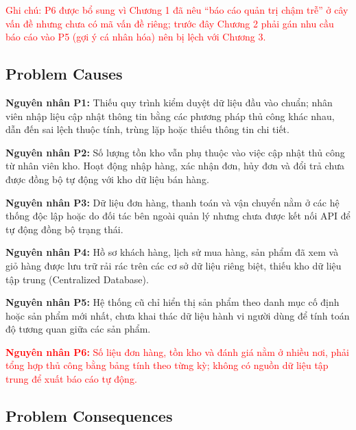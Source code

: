 \documentclass[12pt,a4paper,oneside]{report}
\newif\ifmark \marktrue
\newcommand{\chg}[1]{\ifmark\textcolor{red}{#1}\else #1\fi}
\begin{document}
\chg{Ghi chú: P6 được bổ sung vì Chương 1 đã nêu ``báo cáo quản trị chậm trễ'' ở cây vấn đề nhưng chưa có mã vấn đề riêng; trước đây Chương 2 phải gán nhu cầu báo cáo vào P5 (gợi ý cá nhân hóa) nên bị lệch với Chương 3.}

\subsection{Problem Causes}

\begin{itemize}
  \item \textbf{Nguyên nhân P1:} Thiếu quy trình kiểm duyệt dữ liệu đầu vào chuẩn; nhân viên nhập liệu cập nhật thông tin bằng các phương pháp thủ công khác nhau, dẫn đến sai lệch thuộc tính, trùng lặp hoặc thiếu thông tin chi tiết.
  \item \textbf{Nguyên nhân P2:} Số lượng tồn kho vẫn phụ thuộc vào việc cập nhật thủ công từ nhân viên kho. Hoạt động nhập hàng, xác nhận đơn, hủy đơn và đổi trả chưa được đồng bộ tự động với kho dữ liệu bán hàng.
  \item \textbf{Nguyên nhân P3:} Dữ liệu đơn hàng, thanh toán và vận chuyển nằm ở các hệ thống độc lập hoặc do đối tác bên ngoài quản lý nhưng chưa được kết nối API để tự động đồng bộ trạng thái.
  \item \textbf{Nguyên nhân P4:} Hồ sơ khách hàng, lịch sử mua hàng, sản phẩm đã xem và giỏ hàng được lưu trữ rải rác trên các cơ sở dữ liệu riêng biệt, thiếu kho dữ liệu tập trung (Centralized Database).
  \item \textbf{Nguyên nhân P5:} Hệ thống cũ chỉ hiển thị sản phẩm theo danh mục cố định hoặc sản phẩm mới nhất, chưa khai thác dữ liệu hành vi người dùng để tính toán độ tương quan giữa các sản phẩm.
  \chg{\item \textbf{Nguyên nhân P6:} Số liệu đơn hàng, tồn kho và đánh giá nằm ở nhiều nơi, phải tổng hợp thủ công bằng bảng tính theo từng kỳ; không có nguồn dữ liệu tập trung để xuất báo cáo tự động.}
\end{itemize}

\subsection{Problem Consequences}
\end{document}
